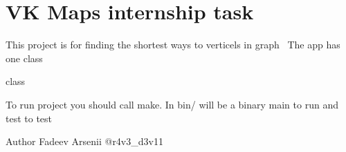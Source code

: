 \chapter{VK Maps internship task}
\hypertarget{index}{}\label{index}
This project is for finding the shortest ways to verticels in graph~\newline
The app has one class
\begin{DoxyItemize}
\item {} class
\end{DoxyItemize}

To run project you should call make. In bin/ will be a binary \textquotesingle{}main\textquotesingle{} to run and \textquotesingle{}test\textquotesingle{} to test

\begin{DoxyAuthor}{Author}
Fadeev Arsenii @r4v3\+\_\+d3v11 
\end{DoxyAuthor}
